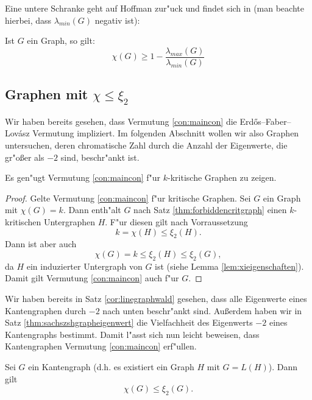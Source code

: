 Eine untere Schranke geht auf Hoffman zur"uck und findet sich in \cite{Hoffman70}(man beachte hierbei, dass $\lambda_{min}(G)$ negativ ist):
\begin{theorem}
  Ist $G$ ein Graph, so gilt:
  $$\chi(G) \geq 1 - \frac{\lambda_{max}(G)}{\lambda_{min}(G)}$$
  \label{thm:Hoffmanev}
\end{theorem}

\subsection{Graphen mit $\chi \leq \xi_{2}$}

Wir haben bereits gesehen, dass Vermutung \ref{con:maincon} die Erd\H{o}s--Faber--Lov\'asz Vermutung impliziert. Im folgenden Abschnitt wollen wir also Graphen untersuchen, deren chromatische Zahl durch die Anzahl der Eigenwerte, die gr"o{\ss}er als $-2$ sind, beschr"ankt ist.
\begin{remark}
  Es gen"ugt Vermutung \ref{con:maincon} f"ur $k$-kritische Graphen zu zeigen. 
\end{remark}

\begin{proof}
  Gelte Vermutung \ref{con:maincon} f"ur kritische Graphen.
  Sei $G$ ein Graph mit $\chi(G) = k$. Dann enth"alt $G$ nach Satz \ref{thm:forbiddencritgraph} einen $k$-kritischen Untergraphen $H$. F"ur diesen gilt nach Vorraussetzung $$k= \chi(H) \leq \xi_{2}(H).$$ Dann ist aber auch $$ \chi(G) = k \leq \xi_{2}(H) \leq \xi_{2}(G) ,$$ da $H$ ein induzierter Untergraph von $G$ ist (siehe Lemma \ref{lem:xieigenschaften}).  Damit gilt Vermutung \ref{con:maincon} auch f"ur $G$.
\end{proof}

Wir haben bereits in Satz \ref{cor:linegraphwald} gesehen, dass alle Eigenwerte eines Kantengraphen durch $-2$ nach unten beschr"ankt sind. Au{\ss}erdem haben wir in Satz \ref{thm:sachszshgrapheigenwert} die Vielfachheit des Eigenwerts $-2$ eines Kantengraphs bestimmt. Damit l"asst sich nun leicht beweisen, dass Kantengraphen Vermutung \ref{con:maincon} erf"ullen. 
\begin{theorem}
  Sei $G$ ein Kantengraph (d.h. es existiert ein Graph $H$ mit $G= L(H)$). Dann gilt $$\chi(G) \leq \xi_2(G).$$
  \label{thm:linegraphconjecture}
\end{theorem}

